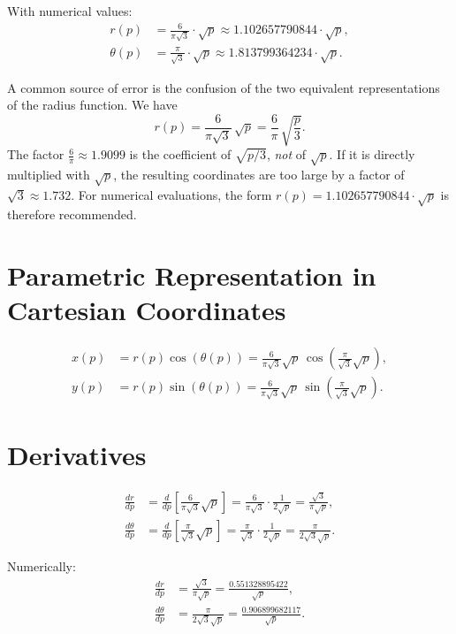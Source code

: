 With numerical values:
\begin{align}
r(p) &= \frac{6}{\pi\sqrt{3}} \cdot \sqrt{p} \approx 1.102657790844 \cdot \sqrt{p}, \\
\theta(p) &= \frac{\pi}{\sqrt{3}} \cdot \sqrt{p} \approx 1.813799364234 \cdot \sqrt{p}.
\end{align}

\begin{anmerkung}
A common source of error is the confusion of the two equivalent representations
of the radius function. We have
\[
  r(p) = \frac{6}{\pi\sqrt{3}}\,\sqrt{p}
       = \frac{6}{\pi}\,\sqrt{\frac{p}{3}}.
\]
The factor $\frac{6}{\pi} \approx 1.9099$ is the coefficient of $\sqrt{p/3}$, \emph{not} 
of $\sqrt{p}$. If it is directly multiplied with $\sqrt{p}$, the resulting 
coordinates are too large by a factor of $\sqrt{3} \approx 1.732$. 
For numerical evaluations, the form 
$r(p) = 1.102657790844 \cdot \sqrt{p}$ is therefore recommended.
\end{anmerkung}

\section{Parametric Representation in Cartesian Coordinates}

\begin{equation}
\begin{aligned}
x(p) &= r(p)\cos(\theta(p))
     = \frac{6}{\pi\sqrt{3}}\sqrt{p}\,
       \cos\!\left(\frac{\pi}{\sqrt{3}}\sqrt{p}\right), \\[6pt]
y(p) &= r(p)\sin(\theta(p))
     = \frac{6}{\pi\sqrt{3}}\sqrt{p}\,
       \sin\!\left(\frac{\pi}{\sqrt{3}}\sqrt{p}\right).
\end{aligned}
\end{equation}

\section{Derivatives}

\begin{satz}
\begin{equation}
\begin{aligned}
\frac{dr}{dp}
  &= \frac{d}{dp}\left[\frac{6}{\pi\sqrt{3}}\sqrt{p}\right]
   = \frac{6}{\pi\sqrt{3}} \cdot \frac{1}{2\sqrt{p}}
   = \frac{\sqrt{3}}{\pi\sqrt{p}}, \\[10pt]
\frac{d\theta}{dp}
  &= \frac{d}{dp}\left[\frac{\pi}{\sqrt{3}}\sqrt{p}\right]
   = \frac{\pi}{\sqrt{3}} \cdot \frac{1}{2\sqrt{p}}
   = \frac{\pi}{2\sqrt{3}\sqrt{p}}.
\end{aligned}
\end{equation}
\end{satz}

Numerically:
\begin{align}
\frac{dr}{dp} &= \frac{\sqrt{3}}{\pi\sqrt{p}} = \frac{0.551328895422}{\sqrt{p}}, \\[4pt]
\frac{d\theta}{dp} &= \frac{\pi}{2\sqrt{3}\sqrt{p}} = \frac{0.906899682117}{\sqrt{p}}.
\end{align}
